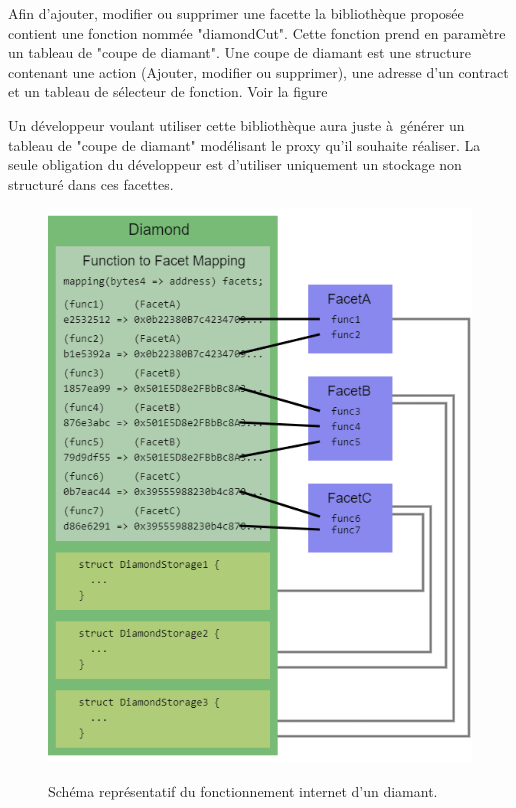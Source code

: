 Afin d'ajouter, modifier ou supprimer une facette la bibliothèque proposée contient une fonction nommée "diamondCut".
Cette fonction prend en paramètre un tableau de "coupe de diamant". Une coupe de diamant est une structure contenant
une action (Ajouter, modifier ou supprimer), une adresse d'un contract et un tableau de sélecteur de fonction. Voir la figure
\pageref{fig:diamond_struct}

Un développeur voulant utiliser cette bibliothèque aura juste à générer un tableau de "coupe de diamant" modélisant le 
proxy qu'il souhaite réaliser. La seule obligation du développeur est d'utiliser uniquement un stockage non structuré dans
ces facettes.

\begin{figure}[h]
  \caption{Schéma représentatif du fonctionnement internet d'un diamant.}
  \includegraphics[scale=0.5]{diamond_struct.png}
  \centering 
  \label{fig:diamond_struct}
\end{figure}

